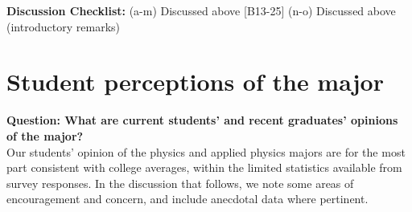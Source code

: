 \documentclass[12pt]{article}
\begin{document}
\noindent
{\bf Discussion Checklist:}
(a-m) Discussed above [B13-25] (n-o) Discussed above (introductory remarks) 

\section{Student perceptions of the major}
\label{sec:perceptions}

{\bf Question: What are current students' and recent graduates' opinions of the major? }\\

Our students' opinion of the physics and applied physics majors are
for the most part consistent with college averages, within the limited
statistics available from survey responses.  In the discussion that follows,
we note some areas of encouragement and concern, and include anecdotal
data where pertinent.

\end{document}
